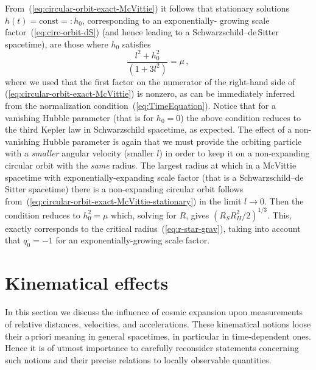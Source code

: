 \documentclass
[rmp,aps,twocolumn,showpacs,preprintnumbers,amsmath,amssymb]{revtex4}
\theoremstyle{plain}
\theoremstyle{definition}
\theoremstyle{remark}
\begin{document}
From~(\ref{eq:circular-orbit-exact-McVittie}) it follows that stationary 
solutions $h(t)=\textrm{const}=:h_0$, corresponding to an exponentially-%
growing scale factor~(\ref{eq:circ-orbit-dS}) (and hence leading 
to a Schwarzschild--de\,Sitter spacetime), are those where $h_0$ satisfies 
%
\begin{equation}\label{eq:circular-orbit-exact-McVittie-stationary}
  \frac{l^2+h_0^2}{(1+3l^2)} = \mu \,,
\end{equation}
%
where we used that the first factor on the numerator  of the right-hand side 
of (\ref{eq:circular-orbit-exact-McVittie}) is nonzero, as can be immediately 
inferred from the normalization condition~(\ref{eq:TimeEquation}). 
Notice that for a vanishing Hubble parameter (that is for $h_0=0$) the above 
condition reduces to the third Kepler law in Schwarzschild spacetime, as 
expected. The effect of a non-vanishing Hubble parameter is again that we 
must provide the orbiting particle with a \emph{smaller} angular velocity 
(smaller $l$) in order to keep it on a non-expanding circular orbit with the 
\emph{same} radius. The largest radius at which in a McVittie spacetime 
with exponentially-expanding scale factor (that is a 
Schwarzschild--de\,Sitter spacetime) there is a non-expanding circular 
orbit follows from~(\ref{eq:circular-orbit-exact-McVittie-stationary}) in 
the limit $l\to 0$. Then the condition reduces to $h_0^2=\mu$ 
which, solving for $R$, gives $(R_S R_H^2/2)^{1/3}$. This, exactly 
corresponds to the critical radius~(\ref{eq:r-star-grav}), taking into 
account that $q_0=-1$ for an exponentially-growing scale factor. 



\section{Kinematical effects}
\label{sec:KinematicalEffects}
%
In this section we discuss the influence of cosmic expansion 
upon measurements of relative distances, velocities, and 
accelerations. These kinematical notions loose their a\,priori
meaning in general spacetimes, in particular in time-dependent 
ones. Hence it is of utmost importance to carefully reconsider 
statements concerning such notions and their precise relations 
to locally observable quantities. 
\end{document}

